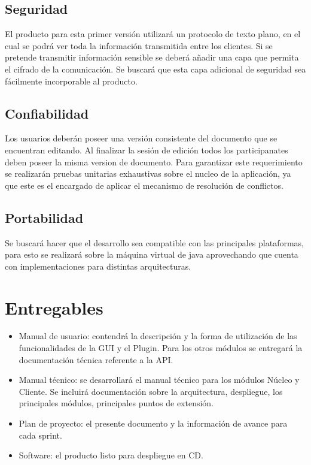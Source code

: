 \documentclass[12pt,a4paper]{article}
\begin{document}
\subsection{Seguridad} El producto para esta primer versión utilizará un protocolo de texto plano, en el cual se podrá ver toda la información transmitida entre los clientes. Si se pretende transmitir información sensible se deberá añadir una capa que permita el cifrado de la comunicación. Se buscará que esta capa adicional de seguridad sea fácilmente incorporable al producto.

\subsection{Confiabilidad} Los usuarios deberán poseer una versión consistente del documento que se encuentran editando. Al finalizar la sesión de edición todos los participanates deben poseer la misma version de documento. Para garantizar este requerimiento se realizarán pruebas unitarias exhaustivas sobre el nucleo de la aplicación, ya que este es el encargado de aplicar el mecanismo de resolución de conflictos.

\subsection{Portabilidad} Se buscará hacer que el desarrollo sea compatible con las principales plataformas, para esto se realizará sobre la máquina virtual de java aprovechando que cuenta con implementaciones para distintas arquitecturas.	
	
	\section{Entregables}

	\begin{itemize}
	\item Manual de usuario: contendrá la descripción y la forma de utilización de las funcionalidades de la GUI y el Plugin. Para los otros módulos se entregará la documentación técnica referente a la API.
	\item Manual técnico: se desarrollará el manual técnico para los módulos Núcleo y Cliente. Se incluirá documentación sobre la arquitectura, despliegue, los principales módulos, principales puntos de extensión.
	\item Plan de proyecto: el presente documento y la información de avance para cada sprint.
	\item Software: el producto listo para despliegue en CD.
	\end{itemize}
\end{document}
